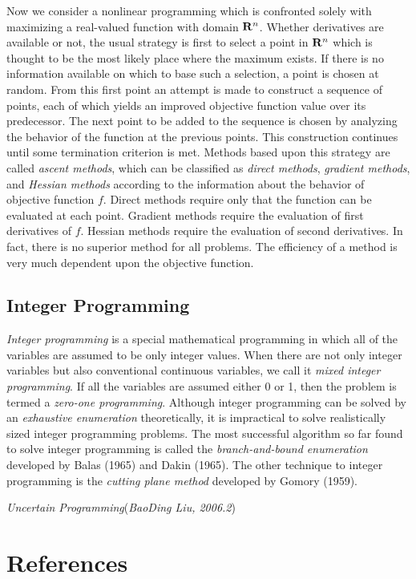 Now we consider a nonlinear programming which is confronted solely with
maximizing a real-valued function with domain $\mathbf{R}^n$.  Whether derivatives are
available or not, the usual strategy is first to select a point in $\mathbf{R}^n$ which
is thought to be the most likely place where the maximum exists. If there is no
information available on which to base such a selection, a point is chosen at
random. From this first point an attempt is made to construct a sequence of
points, each of which yields an improved objective function value over its
predecessor. The next point to be added to the sequence is chosen by analyzing
the behavior of the function at the previous points. This construction continues
until some termination criterion is met. Methods based upon this strategy are
called {\em ascent methods}, which can be classified as {\em direct methods},
{\em gradient methods}, and {\em Hessian methods} according to the information
about the behavior of objective function $f$. Direct methods require only that
the function can be evaluated at each point. Gradient methods require the
evaluation of first derivatives of $f$. Hessian methods require the evaluation
of second derivatives. In fact, there is no superior method for all
problems. The efficiency of a method is very much dependent upon the objective
function.

\subsection{Integer Programming}

{\em Integer programming} is a special mathematical programming in which all of
the variables are assumed to be only integer values. When there are not only
integer variables but also conventional continuous variables, we call it {\em
  mixed integer programming}. If all the variables are assumed either 0 or 1,
then the problem is termed a {\em zero-one programming}. Although integer
programming can be solved by an {\em exhaustive enumeration} theoretically, it
is impractical to solve realistically sized integer programming problems. The
most successful algorithm so far found to solve integer programming is called
the {\em branch-and-bound enumeration} developed by Balas (1965) and Dakin
(1965). The other technique to integer programming is the {\em cutting plane
  method} developed by Gomory (1959).

\hfill\textit{Uncertain Programming\/}\quad(\textsl{BaoDing Liu, 2006.2})

\section*{References}

